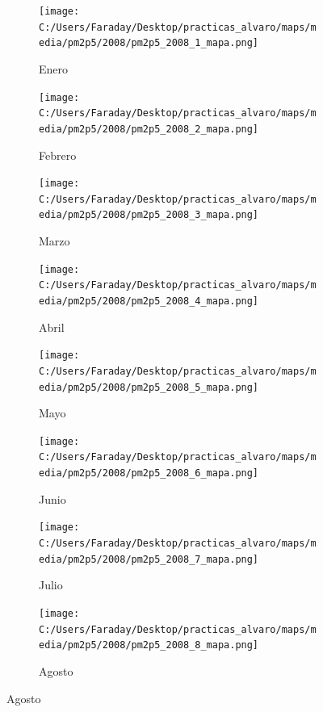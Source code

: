 \documentclass[12pt]{beamer}
\begin{document}
\begin{frame}[squeeze]
\tiny
\begin{figure}[H]
\centering
\begin{subfigure}[H]{0.20\textwidth}
\texttt{[image: C:/Users/Faraday/Desktop/practicas\_alvaro/maps/media/pm2p5/2008/pm2p5\_2008\_1\_mapa.png]}
\captionsetup{labelformat=empty}
\caption{\scriptsize Enero}
\label{fig:map-pm2p5-2008-1}
\end{subfigure}
%
\begin{subfigure}[H]{0.20\textwidth}
\texttt{[image: C:/Users/Faraday/Desktop/practicas\_alvaro/maps/media/pm2p5/2008/pm2p5\_2008\_2\_mapa.png]}
\captionsetup{labelformat=empty}
\caption{\scriptsize Febrero}
\label{fig:map-pm2p5-2008-2}
\end{subfigure}
%
\begin{subfigure}[H]{0.20\textwidth}
\texttt{[image: C:/Users/Faraday/Desktop/practicas\_alvaro/maps/media/pm2p5/2008/pm2p5\_2008\_3\_mapa.png]}
\captionsetup{labelformat=empty}
\caption{\scriptsize Marzo}
\label{fig:map-pm2p5-2008-3}
\end{subfigure}
%
\begin{subfigure}[H]{0.20\textwidth}
\texttt{[image: C:/Users/Faraday/Desktop/practicas\_alvaro/maps/media/pm2p5/2008/pm2p5\_2008\_4\_mapa.png]}
\captionsetup{labelformat=empty}
\caption{\scriptsize Abril}
\label{fig:map-pm2p5-2008-4}
\end{subfigure}

\begin{subfigure}[H]{0.20\textwidth}
\texttt{[image: C:/Users/Faraday/Desktop/practicas\_alvaro/maps/media/pm2p5/2008/pm2p5\_2008\_5\_mapa.png]}
\captionsetup{labelformat=empty}
\caption{\scriptsize Mayo}
\label{fig:map-pm2p5-2008-5}
\end{subfigure}
%
\begin{subfigure}[H]{0.20\textwidth}
\texttt{[image: C:/Users/Faraday/Desktop/practicas\_alvaro/maps/media/pm2p5/2008/pm2p5\_2008\_6\_mapa.png]}
\captionsetup{labelformat=empty}
\caption{\scriptsize Junio}
\label{fig:map-pm2p5-2008-6}
\end{subfigure}
%
\begin{subfigure}[H]{0.20\textwidth}
\texttt{[image: C:/Users/Faraday/Desktop/practicas\_alvaro/maps/media/pm2p5/2008/pm2p5\_2008\_7\_mapa.png]}
\captionsetup{labelformat=empty}
\caption{\scriptsize Julio}
\label{fig:map-pm2p5-2008-7}
\end{subfigure}
%
\begin{subfigure}[H]{0.20\textwidth}
\texttt{[image: C:/Users/Faraday/Desktop/practicas\_alvaro/maps/media/pm2p5/2008/pm2p5\_2008\_8\_mapa.png]}
\captionsetup{labelformat=empty}
\caption{\scriptsize Agosto}
\label{fig:map-pm2p5-2008-8}
\end{subfigure}


\end{figure}
\end{frame}
\end{document}

